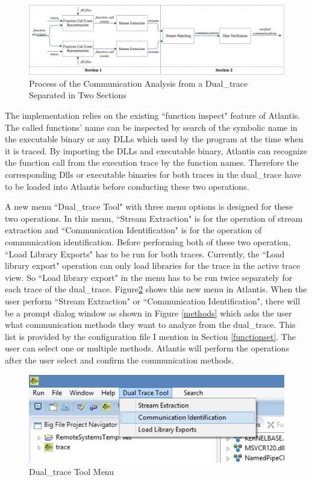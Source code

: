 \begin{figure}[H]
\centerline{\includegraphics[scale=0.55]{Figures/overviewintwo}}
\caption{Process of the Communication Analysis from a Dual\_trace Separated in Two Sections}
\label{overviewintwo}
\end{figure}

The implementation relies on the existing ``function inspect" feature of Atlantis. The called functions' name can be inspected  by  search of the symbolic name in the executable binary or any DLLs which used by the program at the time when it is traced. By importing the DLLs and executable binary, Atlantis can recognize the function call from the execution trace by the function names. Therefore the corresponding Dlls or executable binaries for both traces in the dual\_trace have to be loaded into Atlantis before conducting these two operations.

A new menu ``Dual\_trace Tool" with three menu options is designed for these two operations. In this menu, ``Stream Extraction" is for the operation of stream extraction and ``Communication Identification" is for the operation of communication identification. Before performing both of these two operation, ``Load Library Exports" has to be run for both traces. Currently, the ``Load library export"  operation can only load libraries for the trace in the active trace view. So ``Load library export"  in the menu has to be run twice separately for each trace of the dual\_trace.  Figure\ref{dualtracetoolmenu} shows this new menu in Atlantis. When the user perform ``Stream Extraction" or ``Communication Identification", there will be a prompt dialog window as shown in Figure \ref{methods} which asks the user what communication methods they want to analyze from the dual\_trace. This list is provided by the configuration file I mention in Section \ref{functionset}. The user can select one or multiple methods. Atlantis will perform the operations after the user select and confirm the communication methods.

\begin{figure}[H]
\centerline{\includegraphics{Figures/dualtracetoolmenu}}
 \caption{Dual\_trace Tool Menu}
\label{dualtracetoolmenu}
\end{figure}

